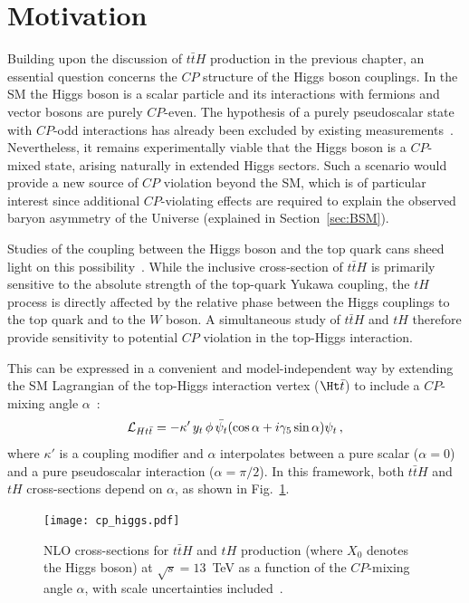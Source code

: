 \section{Motivation}

Building upon the discussion of $t\bar{t}H$ production in the previous chapter, an essential question concerns the $CP$ structure of the Higgs boson couplings. 
In the SM the Higgs boson is a scalar particle and its interactions with fermions and vector bosons are purely $CP$-even. 
The hypothesis of a purely pseudoscalar state with $CP$-odd interactions has already been excluded by existing measurements~\cite{ATLAS:2015yey,CMS:2014quz,ATLAS:2022ers,CMS:2022dbx}. 
Nevertheless, it remains experimentally viable that the Higgs boson is a $CP$-mixed state, arising naturally in extended Higgs sectors. 
Such a scenario would provide a new source of $CP$ violation beyond the SM, which is of particular interest since additional $CP$-violating effects are required to explain the observed baryon asymmetry of the Universe (explained in Section~\ref{sec:BSM}). 

Studies of the coupling between the Higgs boson and the top quark cans sheed light on this possibility~\cite{Gunion:1996xu, Ellis:2013yxa, He:2015spx, Boudjema:2015nda}. 
While the inclusive cross-section of $t\bar{t}H$ is primarily sensitive to the absolute strength of the top-quark Yukawa coupling, the $tH$ process is directly affected by the relative phase between the Higgs couplings to the top quark and to the $W$ boson. 
A simultaneous study of $t\bar{t}H$ and $tH$ therefore provide sensitivity to potential $CP$ violation in the top-Higgs interaction. 

This can be expressed in a convenient and model-independent way by extending the SM Lagrangian of the top-Higgs interaction vertex ($\Ht\bar{t}$) to include a $CP$-mixing angle $\alpha$~\cite{Demartin_2014}:
\begin{equation}
{\cal L}_{Ht\bar{t}}=-\kappa' \, y_t \, \phi \, \bar{\psi_t}(\cos{\alpha} + i\gamma_5\sin{\alpha})\psi_t\,,
\end{equation}
where $\kappa'$ is a coupling modifier and $\alpha$ interpolates between a pure scalar ($\alpha=0$) and a pure pseudoscalar interaction ($\alpha=\pi/2$). 
In this framework, both $t\bar{t}H$ and $tH$ cross-sections depend on $\alpha$, as shown in Fig.~\ref{fig:th_cp_dependence}. 

\begin{figure}[htbp]
  \centering
  \texttt{[image: cp\_higgs.pdf]}
  \caption{NLO cross-sections for $t\bar{t}H$ and $tH$ production (where $X_{0}$ denotes the Higgs boson) at $\sqrt{s}=13$~TeV as a function of the $CP$-mixing angle $\alpha$, with scale uncertainties included~\cite{demartin2015}.}
  \label{fig:th_cp_dependence}
\end{figure}

